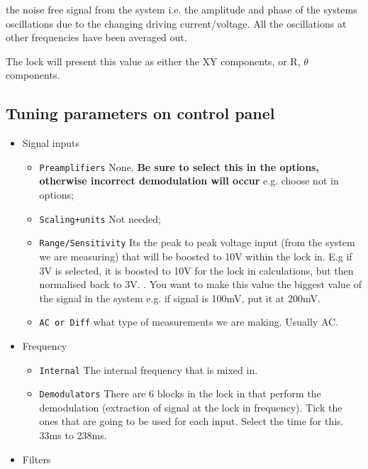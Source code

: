   \noindent the noise free signal from the system i.e. the amplitude and phase of the systems oscillations due to the changing driving current/voltage. All the oscillations at other frequencies have been averaged out.
  
  The lock will present this value as either the XY components, or R, $ \theta $ components.
  
  \subsection{Tuning parameters on control panel}
   \begin{itemize}
   	\item Signal inputs
   	\begin{itemize}
   		\item \texttt{Preamplifiers} {\ra None. \textbf{Be sure to select this in the options, otherwise incorrect demodulation will occur} e.g. choose  not  in options;}
		\item \texttt{Scaling+units} {\ra Not needed;}
		\item \texttt{Range/Sensitivity} \ra Its the peak to peak voltage input (from the system we are measuring) that will be boosted to 10V within the lock in. E.g if 3V is selected, it is boosted to 10V for the lock in calculations, but then normalised back to 3V. . You want to make this value the biggest value of the signal in the system e.g. if signal is 100mV, put it at 200mV.
		\item \texttt{AC or Diff} \ra what type of measurements we are making. Usually AC.
   	\end{itemize}
    \item Frequency
    \begin{itemize}
    	\item \texttt{Internal} \ra The internal frequency that is mixed in. 
    	\item \texttt{Demodulators} \ra There are 6 blocks in the lock in that perform the demodulation (extraction of signal at the lock in frequency). Tick the ones that are going to be used for each input. Select the time for this. {33ms to 238ms.} 
    \end{itemize}
    \item Filters

\end{itemize}
